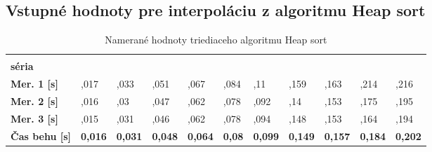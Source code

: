 \documentclass[12pt]{article}
\begin{document}
\begin{listing}[language=C++, caption=Funkcia Heapify]
\subsection*{Vstupné hodnoty pre interpoláciu z algoritmu Heap sort}

    \begin{table}[!ht]  
    \footnotesize    
    \caption{Namerané hodnoty triediaceho algoritmu Heap sort}
    \begin{tabularx}{\textwidth}{|p{2.1cm}|*{10}{>{\centering\arraybackslash}X|}}
\hline
\rowcolor{lightblue}
\multicolumn{1}{|r|}{\textbf{n {[}mil{]}}} & \multirow[t]{2}{*}{\textbf{1}} & \multirow[t]{2}{*}{\textbf{2}} & \multirow[t]{2}{*}{\textbf{3}} & \multirow[t]{2}{*}{\textbf{4}} & \multirow[t]{2}{*}{\textbf{5}} & \multirow[t]{2}{*}{\textbf{6}} & \multirow[t]{2}{*}{\textbf{7}} & \multirow[t]{2}{*}{\textbf{8}} & \multirow[t]{2}{*}{\textbf{9}} & \multirow[t]{2}{*}{\textbf{10}} \\

\cellcolor{myGrey}\textbf{séria} &\rowcolor{lightblue} & & & & & & & & & \\ 
\hline
\cellcolor{myGrey}\textbf{Mer. 1 {[}s{]}} & 0,017 & 0,033 & 0,051 & 0,067 & 0,084 & 0,11 & 0,159 & 0,163 & 0,214 & 0,216 \\ 
\hline
\cellcolor{myGrey}\textbf{Mer. 2 {[}s{]}} & 0,016 & 0,03 & 0,047 & 0,062 & 0,078 & 0,092 & 0,14 & 0,153 & 0,175 & 0,195 \\ 
\hline
\cellcolor{myGrey}\textbf{Mer. 3 {[}s{]}} & 0,015 & 0,031 & 0,046 & 0,062 & 0,078 & 0,094 & 0,148 & 0,153 & 0,164 & 0,194 \\ 
\hline
\cellcolor{myGrey}\textbf{Čas behu {[}s{]}} & \textbf{0,016} & \textbf{0,031} & \textbf{0,048} & \textbf{0,064} & \textbf{0,08} & \textbf{0,099} & \textbf{0,149} & \textbf{0,157} & \textbf{0,184} & \textbf{0,202} \\
\hline
\end{tabularx}
\label{tab-Heap}
\end{table} 




\end{listing}
\end{document}
